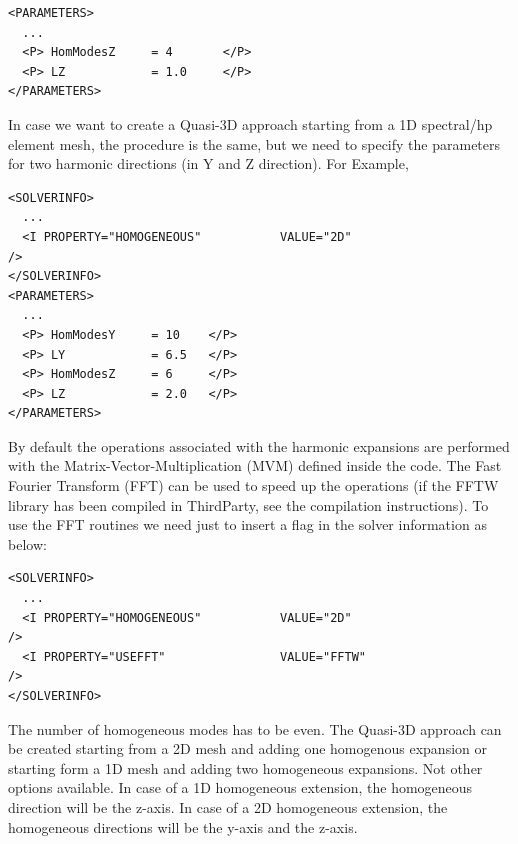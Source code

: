 \begin{lstlisting}[style=XMLStyle]
<PARAMETERS>
  ...
  <P> HomModesZ     = 4       </P>
  <P> LZ            = 1.0     </P>
</PARAMETERS>
\end{lstlisting}

In case we want to create a Quasi-3D approach starting from a 1D spectral/hp
element mesh, the procedure is the same, but we need to specify the parameters
for two harmonic directions (in Y and Z direction). For Example,

\begin{lstlisting}[style=XMLStyle]
<SOLVERINFO>
  ...
  <I PROPERTY="HOMOGENEOUS"           VALUE="2D"                         />
</SOLVERINFO>
<PARAMETERS>
  ...
  <P> HomModesY     = 10    </P>
  <P> LY            = 6.5   </P>
  <P> HomModesZ     = 6     </P>
  <P> LZ            = 2.0   </P>
</PARAMETERS>
\end{lstlisting}

By default the operations associated with the harmonic expansions are performed
with the Matrix-Vector-Multiplication (MVM) defined inside the code. The Fast
Fourier Transform (FFT) can be used to speed up the operations (if the FFTW
library has been compiled in ThirdParty, see the compilation instructions). To
use the FFT routines we need just to insert a flag in the solver information as
below:

\begin{lstlisting}[style=XMLStyle]
<SOLVERINFO>
  ...
  <I PROPERTY="HOMOGENEOUS"           VALUE="2D"                         />
  <I PROPERTY="USEFFT"                VALUE="FFTW"                       />
</SOLVERINFO>
\end{lstlisting}

The number of homogeneous modes has to be even. The Quasi-3D approach can be
created starting from a 2D mesh and adding one homogenous expansion or starting
form a 1D mesh and adding two homogeneous expansions. Not other options
available. In case of a 1D homogeneous extension, the homogeneous direction will
be the z-axis. In case of a 2D homogeneous extension, the homogeneous directions
will be the y-axis and the z-axis.

